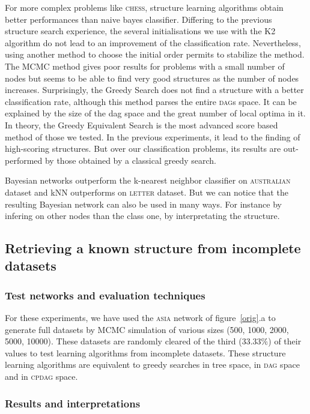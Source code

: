 For more complex problems like \textsc{chess}, structure learning algorithms obtain better performances than naive bayes classifier.
%
Differing to the previous structure search experience, the several initialisations we use with the K2 algorithm do not lead to an improvement of the classification rate.
Nevertheless, using another method to choose the initial order permits to stabilize the method.
The MCMC method gives poor results for problems with a small number of nodes but seems to be able to find very good structures as the number of nodes increases.
%
Surprisingly, the Greedy Search does not find a structure with a better classification rate, although this method parses the entire \textsc{dag}s space.
It can be explained by the size of the dag space and the great number of local optima in it.
%
In theory, the Greedy Equivalent Search is the most advanced score based method of those we tested.
In the previous experiments, it lead to the finding of high-scoring structures.
But over our classification problems, its results are out-performed by those obtained by a classical greedy search.

Bayesian networks outperform the k-nearest neighbor classifier on \textsc{australian} dataset and kNN outperforms on \textsc{letter} dataset.
But we can notice that the resulting Bayesian network can also be used in many ways.
For instance by infering on other nodes than the class one, by interpretating the structure.

\subsection{Retrieving a known structure from incomplete datasets}

\subsubsection*{Test networks and evaluation techniques}

For these experiments, we have used the \textsc{asia} network of figure~\ref{orig}.a \cite{Lau88} to generate full datasets by MCMC simulation of various sizes (500, 1000, 2000, 5000, 10000).
These datasets are randomly cleared of the third ($33.33\%$) of their values to test learning algorithms from incomplete datasets.
These structure learning algorithms are equivalent to greedy searches in tree space, in \textsc{dag} space and in \textsc{cpdag} space.

\subsubsection*{Results and interpretations}

